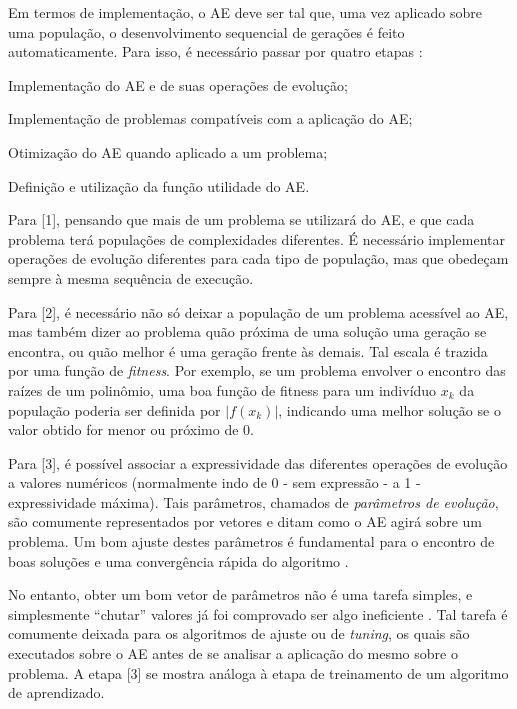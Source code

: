 Em termos de implementação, o AE deve ser tal que, uma vez aplicado sobre uma população, o desenvolvimento sequencial de gerações é feito automaticamente. Para isso, é necessário passar por quatro etapas \cite{eiben2011parameter}:

\begin{enumerate}[label={[\arabic*]}]
	\item Implementação do AE e de suas operações de evolução;
	\item Implementação de problemas compatíveis com a aplicação do AE;
	\item Otimização do AE quando aplicado a um problema;
	\item Definição e utilização da função utilidade do AE. 
\end{enumerate}

Para [1], pensando que mais de um problema se utilizará do AE, e que cada problema terá populações de complexidades diferentes. É necessário implementar operações de evolução diferentes para cada tipo de população, mas que obedeçam sempre à mesma sequência de execução.

Para [2], é necessário não só deixar a população de um problema acessível ao AE, mas também dizer ao problema quão próxima de uma solução uma geração se encontra, ou quão melhor é uma geração frente às demais. Tal escala é trazida por uma função de \emph{fitness}. Por exemplo, se um problema envolver o encontro das raízes de um polinômio, uma boa função de fitness para um indivíduo $x_k$ da população poderia ser definida por $|f(x_k)|$, indicando uma melhor solução se o valor obtido for menor ou próximo de 0.

Para [3], é possível associar a expressividade das diferentes operações de evolução a valores numéricos (normalmente indo de 0 - sem expressão - a 1 - expressividade máxima). Tais parâmetros, chamados de \emph{parâmetros de evolução}, são comumente representados por vetores e ditam como o AE agirá sobre um problema. Um bom ajuste destes parâmetros é fundamental para o encontro de boas soluções e uma convergência rápida do algoritmo \cite{eiben1999parameter}.

No entanto, obter um bom vetor de parâmetros não é uma tarefa simples, e simplesmente “chutar” valores já foi comprovado ser algo ineficiente \cite{smit2009comparing}. Tal tarefa é comumente deixada para os algoritmos de ajuste ou de \emph{tuning}, os quais são executados sobre o AE antes de se analisar a aplicação do mesmo sobre o problema. A etapa [3] se mostra análoga à etapa de treinamento de um algoritmo de aprendizado.

